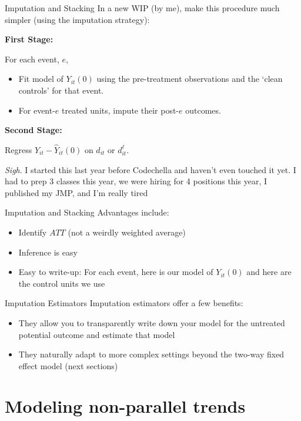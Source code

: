 \documentclass[t]{beamer}
\begin{document}
\begin{frame}{Imputation and Stacking}
  In a new WIP (by me), make this procedure much simpler (using the imputation strategy):

  \bigskip
  \textbf{First Stage:}

  For each event, $e$,
  \begin{itemize}
    \item Fit model of $Y_{it}(0)$ using the pre-treatment observations and the `clean controls' for that event.

    \item For event-$e$ treated units, impute their post-$e$ outcomes.
  \end{itemize}

  \bigskip
  \textbf{Second Stage:}

  Regress $Y_{it} - \hat{Y}_{it}(0)$ on $d_{it}$ or $d_{it}^\ell$.


  \bigskip\bigskip
  {\tiny \emph{Sigh}. I started this last year before Codechella and haven't even touched it yet. I had to prep 3 classes this year, we were hiring for 4 positions this year, I published my JMP, and I'm really tired}
\end{frame}

\begin{frame}{Imputation and Stacking}
  Advantages include:
  \begin{itemize}
    \item Identify $ATT$ (not a weirdly weighted average)
    \item Inference is easy
    \item Easy to write-up: For each event, here is our model of $Y_{it}(0)$ and here are the control units we use
  \end{itemize}
\end{frame}

\begin{frame}{Imputation Estimators}
  Imputation estimators offer a few benefits:
  \begin{itemize}
    \item They allow you to transparently write down your model for the untreated potential outcome and estimate that model
    \item They naturally adapt to more complex settings beyond the two-way fixed effect model (next sections)
  \end{itemize}
\end{frame}

\section{Modeling non-parallel trends}
\end{document}
